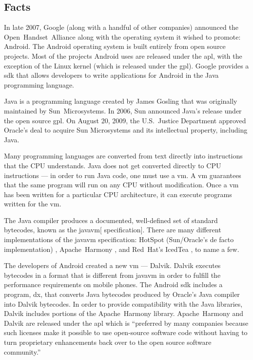 \documentclass[11pt]{article}
\begin{document}
\begin{multicols}{2}
\setcounter{page}{1}

\section{Facts} %
\label{sec:facts}

In late 2007, Google (along with a handful of other companies) announced the
Open~Handset~Alliance \cite{open-handset-alliance-ann} along with the operating
system it wished to promote: Android.  The Android operating system is built
entirely from open source projects.  Most of the projects Android uses are
released under the \gls{apl}, with the exception of the Linux kernel (which is
released under the \gls{gpl}).  Google provides a \gls{sdk} that allows
developers to write applications for Android in the Java programming language.

Java is a programming language created by James Gosling that was originally
maintained by Sun~Microsystems.  In 2006, Sun announced Java's release under the
open source \gls{gpl}. \cite{sun-open-sources-java} On August 20, 2009,
the U.S.~Justice Department approved Oracle's deal to acquire Sun Microsystems
and its intellectual property, including Java. \cite{oracle-buys-sun}

Many programming languages are converted from text directly into instructions
that the CPU understands.  Java does not get converted directly to CPU
instructions --- in order to run Java code, one must use a \gls{vm}.  A \gls{vm}
guarantees that the same program will run on any CPU without modification.  Once
a \gls{vm} has been written for a particular CPU architecture, it can execute
programs written for the \gls{vm}.

The Java compiler produces a documented, well-defined set of standard
\glspl{bytecode}, known as the \gls{javavm}[ specification]. \cite[Chapter
4]{javavm-bytecode}  There are many different implementations of the
\gls{javavm} specification: HotSpot (Sun/Oracle's de facto implementation)
\cite{hotspot}, Apache~Harmony \cite{apache-harmony}, and Red~Hat's IcedTea
\cite{icedtea}, to name a few.

The developers of Android created a new \gls{vm} --- Dalvik.  Dalvik executes
\glspl{bytecode} in a format that is different from \gls{javavm} in order to
fulfill the performance requirements on mobile phones.  \cite{dalvik-bytecode}
\cite{dalvik-vm-arch} The Android \gls{sdk} includes a program, dx, that
converts Java \glspl{bytecode} produced by Oracle's Java compiler into Dalvik
\glspl{bytecode}.  \cite{android-sdk-building} In order to provide compatibility
with the Java libraries, Dalvik includes portions of the Apache~Harmony library.
\cite{apache-harmony} \cite{dalvik-readme}  Apache~Harmony and Dalvik are
released under the \gls{apl} \cite{apache-license} which is ``preferred by many
companies because such licenses make it possible to use open-source software
code without having to turn proprietary enhancements back over to the open
source software community.'' \cite{why-apache2-license}


\end{multicols}
\end{document}
